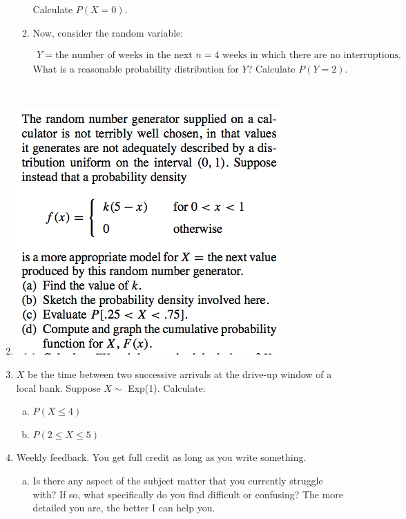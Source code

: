\documentclass{article}\usepackage{graphicx, color}
\numberwithin{equation}{section}
\begin{document}
\begin{flushleft}
\begin{enumerate}[1. ]
\begin{enumerate}
Calculate $P(X = 0)$.


\item Now, consider the random variable:

\begin{align*}
Y = \text{the number of weeks in the next $n=4$ weeks in which there are no interruptions.}
\end{align*}
 What is a reasonable probability distribution for $Y$? Calculate $P(Y = 2)$. 


\end{enumerate} $\quad$ \newline





\item 
{} \includegraphics{../../fig/ch5s2p1.png}




\item $X$ be the time between two successive arrivals at the drive-up window of a local bank. Suppose $X \sim$ Exp(1). Calculate:

\begin{enumerate}[a. ]
\item $P(X \le 4)$
\item $P(2 \le X \le 5)$
\end{enumerate}








\item Weekly feedback. You get full credit as long as you write something.
\begin{enumerate}[a. ]
\item Is there any aspect of the subject matter that you currently struggle with? If so, what specifically do you find difficult or confusing? The more detailed you are, the better I can help you.



\end{enumerate}
\end{enumerate}
\end{flushleft}
\end{document}
